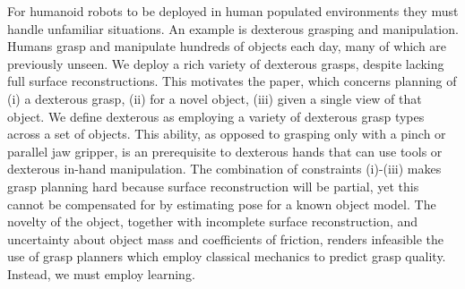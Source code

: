 \noindent
For humanoid robots to be deployed in human populated environments they must handle unfamiliar situations. An example is dexterous grasping and manipulation. Humans grasp and manipulate hundreds of objects each day, many of which are previously unseen. We deploy a rich variety of dexterous grasps, despite lacking full surface reconstructions. This motivates the paper, which concerns planning of (i) a dexterous grasp, (ii) for a novel object, (iii) given a single view of that object. We define dexterous as employing a variety of dexterous grasp types across a set of objects. This ability, as opposed to grasping only with a pinch or parallel jaw gripper, is an prerequisite to dexterous hands that can use tools or dexterous in-hand manipulation. The combination of constraints (i)-(iii) makes grasp planning hard because surface reconstruction will be partial, yet this cannot be compensated for by estimating pose for a known object model. The novelty of the object, together with incomplete surface reconstruction, and uncertainty about object mass and coefficients of friction, renders infeasible the use of grasp planners which employ classical mechanics to predict grasp quality. Instead, we must employ learning.

